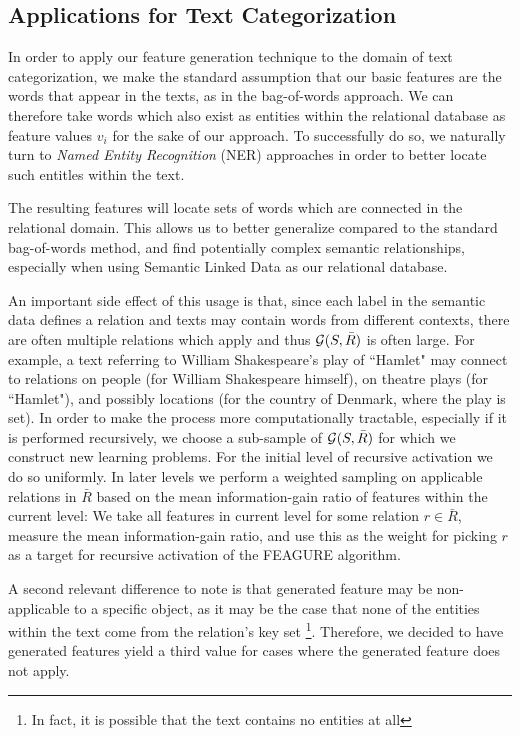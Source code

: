 \documentclass[twoside,11pt]{article}
\theoremstyle{definition}
\begin{document}
\subsection{Applications for Text Categorization}
In order to apply our feature generation technique to the domain of text categorization, we make the standard assumption that our basic features are the words that appear in the texts, as in the bag-of-words \cite{Wu:1981:CST:1013228.511759,salton1983introduction} approach. We can therefore take words which also exist as entities within the relational database as feature values $v_i$ for the sake of our approach. To successfully do so, we naturally turn to \emph{Named Entity Recognition} (NER) approaches in order to better locate such entitles within the text.

The resulting features will locate sets of words which are connected in the relational domain. This allows us to better generalize compared to the standard bag-of-words method, and find potentially complex semantic relationships, especially when using Semantic Linked Data as our relational database.

An important side effect of this usage is that, since each label in the semantic data defines a relation and texts may contain words from different contexts, there are often multiple relations which apply and thus ${\cal G}(S,\bar{R})$ is often large. For example, a text referring to William Shakespeare's play of ``Hamlet" may connect to relations on people (for William Shakespeare himself), on theatre plays (for ``Hamlet"), and possibly locations (for the country of Denmark, where the play is set).
In order to make the process more computationally tractable, especially if it is performed recursively, we choose a sub-sample of ${\cal G}(S,\bar{R})$ for which we construct new learning problems. For the initial level of recursive activation we do so uniformly. In later levels we perform a weighted sampling on applicable relations in $\bar{R}$ based on the mean information-gain ratio of features within the current level: We take all features in current level for some relation $r\in\bar{R}$, measure the mean information-gain ratio, and use this as the weight for picking $r$ as a target for recursive activation of the FEAGURE algorithm. 

A second relevant difference to note is that generated feature may be non-applicable to a specific object, as it may be the case that none of the entities within the text come from the relation's key set \footnote{In fact, it is possible that the text contains no entities at all}. Therefore, we decided to have generated features yield a third value for cases where the generated feature does not apply.
\end{document}
